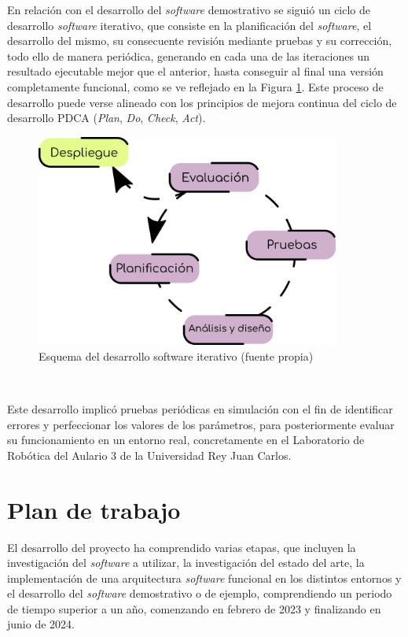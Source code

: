 En relación con el desarrollo del \textit{software} demostrativo se siguió un
ciclo de desarrollo \textit{software} iterativo, que consiste en la
planificación del \textit{software}, el desarrollo del mismo, su consecuente
revisión mediante pruebas y su corrección, todo ello de manera periódica,
generando en cada una de las iteraciones un resultado ejecutable mejor que el
anterior, hasta conseguir al final una versión completamente funcional, como se
ve reflejado en la Figura \ref{fig:desarrollo_iterativo}.
Este proceso de desarrollo puede verse alineado con los principios de mejora
continua del ciclo de desarrollo PDCA (\textit{Plan}, \textit{Do},
\textit{Check}, \textit{Act}).

\begin{figure} [h!]
  \begin{center}
    \includegraphics[width=10cm]{figs/desarrollo_iterativo}
  \end{center}
  \caption{Esquema del desarrollo software iterativo (fuente propia)}
  \label{fig:desarrollo_iterativo}
\end{figure}\

Este desarrollo implicó pruebas periódicas en simulación con el fin de
identificar errores y perfeccionar los valores de los parámetros, para
posteriormente evaluar su funcionamiento en un entorno real, concretamente en el
Laboratorio de Robótica del Aulario 3 de la Universidad Rey Juan Carlos.


\section{Plan de trabajo}
\label{sec:plantrabajo}

El desarrollo del proyecto ha comprendido varias etapas, que incluyen la
investigación del \textit{software} a utilizar, la investigación del estado del
arte, la implementación de una arquitectura \textit{software} funcional en los
distintos entornos y el desarrollo del \textit{software} demostrativo o de
ejemplo, comprendiendo un periodo de tiempo superior a un año, comenzando en
febrero de 2023 y finalizando en junio de 2024.

